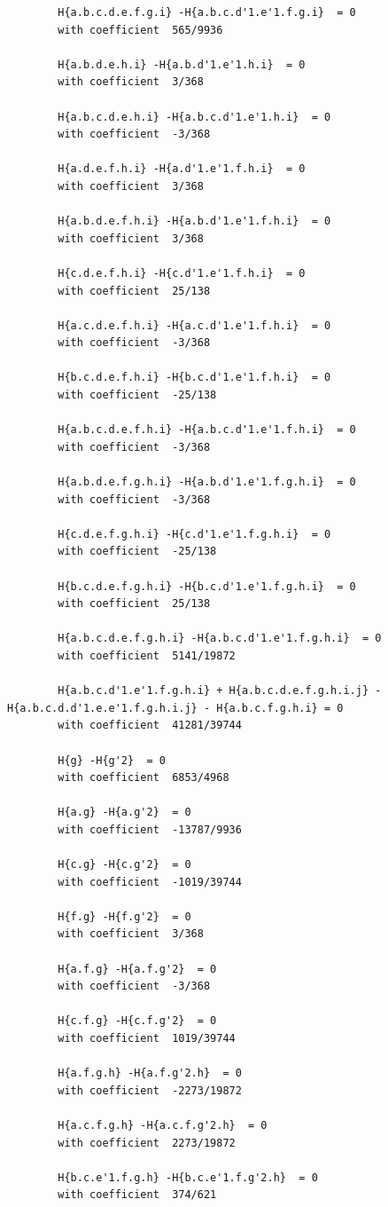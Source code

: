 \documentclass[11pt, a4paper]{kybernetika}
\begin{document}
\begin{verbatim}
		H{a.b.c.d.e.f.g.i} -H{a.b.c.d'1.e'1.f.g.i}  = 0
		with coefficient  565/9936
		
		H{a.b.d.e.h.i} -H{a.b.d'1.e'1.h.i}  = 0
		with coefficient  3/368
		
		H{a.b.c.d.e.h.i} -H{a.b.c.d'1.e'1.h.i}  = 0
		with coefficient  -3/368
		
		H{a.d.e.f.h.i} -H{a.d'1.e'1.f.h.i}  = 0
		with coefficient  3/368
		
		H{a.b.d.e.f.h.i} -H{a.b.d'1.e'1.f.h.i}  = 0
		with coefficient  3/368
		
		H{c.d.e.f.h.i} -H{c.d'1.e'1.f.h.i}  = 0
		with coefficient  25/138
		
		H{a.c.d.e.f.h.i} -H{a.c.d'1.e'1.f.h.i}  = 0
		with coefficient  -3/368
		
		H{b.c.d.e.f.h.i} -H{b.c.d'1.e'1.f.h.i}  = 0
		with coefficient  -25/138
		
		H{a.b.c.d.e.f.h.i} -H{a.b.c.d'1.e'1.f.h.i}  = 0
		with coefficient  -3/368
		
		H{a.b.d.e.f.g.h.i} -H{a.b.d'1.e'1.f.g.h.i}  = 0
		with coefficient  -3/368
		
		H{c.d.e.f.g.h.i} -H{c.d'1.e'1.f.g.h.i}  = 0
		with coefficient  -25/138
		
		H{b.c.d.e.f.g.h.i} -H{b.c.d'1.e'1.f.g.h.i}  = 0
		with coefficient  25/138
		
		H{a.b.c.d.e.f.g.h.i} -H{a.b.c.d'1.e'1.f.g.h.i}  = 0
		with coefficient  5141/19872
		
		H{a.b.c.d'1.e'1.f.g.h.i} + H{a.b.c.d.e.f.g.h.i.j} - H{a.b.c.d.d'1.e.e'1.f.g.h.i.j} - H{a.b.c.f.g.h.i} = 0
		with coefficient  41281/39744
		
		H{g} -H{g'2}  = 0
		with coefficient  6853/4968
		
		H{a.g} -H{a.g'2}  = 0
		with coefficient  -13787/9936
		
		H{c.g} -H{c.g'2}  = 0
		with coefficient  -1019/39744
		
		H{f.g} -H{f.g'2}  = 0
		with coefficient  3/368
		
		H{a.f.g} -H{a.f.g'2}  = 0
		with coefficient  -3/368
		
		H{c.f.g} -H{c.f.g'2}  = 0
		with coefficient  1019/39744
		
		H{a.f.g.h} -H{a.f.g'2.h}  = 0
		with coefficient  -2273/19872
		
		H{a.c.f.g.h} -H{a.c.f.g'2.h}  = 0
		with coefficient  2273/19872
		
		H{b.c.e'1.f.g.h} -H{b.c.e'1.f.g'2.h}  = 0
		with coefficient  374/621
		

\end{verbatim}
\end{document}
